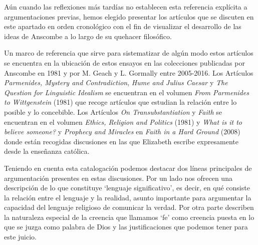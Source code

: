 Aún cuando las reflexiones más tardías no establecen esta referencia explícita a argumentaciones previas, hemos elegido presentar los artículos que se discuten en este apartado en orden cronológico con el fin de visualizar el desarrollo de las ideas de Anscombe a lo largo de su quehacer filosófico. 

Un marco de referencia que sirve para sistematizar de algún modo estos artículos se encuentra en la ubicación de estos ensayos en las colecciones publicadas por Anscombe en 1981 y por M. Geach y L. Gormally entre 2005-2016. Los Artículos \emph{Parmenides, Mystery and Contradiction}, \emph{Hume and Julius Caesar} y \emph{The Question for Linguistic Idealism} se encuentran en el volumen \emph{From Parmenides to Wittgenstein} (1981) que recoge artículos que estudian la relación entre lo posible y lo concebible. Los Artículos \emph{On Transubstantiation} y \emph{Faith} se encuentran en el volumen \emph{Ethics, Religion and Politics} (1981) y \emph{What is it to believe someone?} y \emph{Prophecy and Miracles} en \emph{Faith in a Hard Ground} (2008) donde están recogidas discusiones en las que Elizabeth escribe expresamente desde la enseñanza católica. 

Teniendo en cuenta esta catalogación podemos destacar dos líneas principales de argumentación presentes en estas discusiones. Por un lado nos ofrecen una descripción de lo que constituye `lenguaje significativo', es decir, en qué consiste la relación entre el lenguaje y la realidad, asunto importante para argumentar la capacidad del lenguaje religioso de comunicar la verdad. Por otra parte describen la naturaleza especial de la creencia que llamamos `fe' como creencia puesta en lo que se juzga como palabra de Dios y las justificaciones que podemos tener para este juicio.
